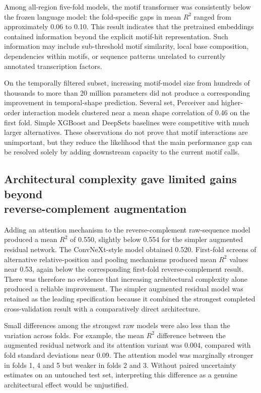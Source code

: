 \documentclass[a4paper,12pt]{article}
\begin{document}
Among all-region five-fold models, the motif transformer was consistently below the frozen language model: the fold-specific gaps in mean $R^2$ ranged from approximately 0.06 to 0.10. This result indicates that the pretrained embeddings contained information beyond the explicit motif-hit representation. Such information may include sub-threshold motif similarity, local base composition, dependencies within motifs, or sequence patterns unrelated to currently annotated transcription factors.

On the temporally filtered subset, increasing motif-model size from hundreds of thousands to more than 20 million parameters did not produce a corresponding improvement in temporal-shape prediction. Several set, Perceiver and higher-order interaction models clustered near a mean shape correlation of 0.46 on the first fold. Simple XGBoost and DeepSets baselines were competitive with much larger alternatives. These observations do not prove that motif interactions are unimportant, but they reduce the likelihood that the main performance gap can be resolved solely by adding downstream capacity to the current motif calls.

\subsection[Architectural complexity gave limited gains beyond reverse-complement augmentation]{Architectural complexity gave limited gains beyond\\ reverse-complement augmentation}

Adding an attention mechanism to the reverse-complement raw-sequence model produced a mean $R^2$ of 0.550, slightly below 0.554 for the simpler augmented residual network. The ConvNeXt-style model obtained 0.520. First-fold screens of alternative relative-position and pooling mechanisms produced mean $R^2$ values near 0.53, again below the corresponding first-fold reverse-complement result. There was therefore no evidence that increasing architectural complexity alone produced a reliable improvement. The simpler augmented residual model was retained as the leading specification because it combined the strongest completed cross-validation result with a comparatively direct architecture.

Small differences among the strongest raw models were also less than the variation across folds. For example, the mean $R^2$ difference between the augmented residual network and its attention variant was 0.004, compared with fold standard deviations near 0.09. The attention model was marginally stronger in folds 1, 4 and 5 but weaker in folds 2 and 3. Without paired uncertainty estimates on an untouched test set, interpreting this difference as a genuine architectural effect would be unjustified.
\end{document}
